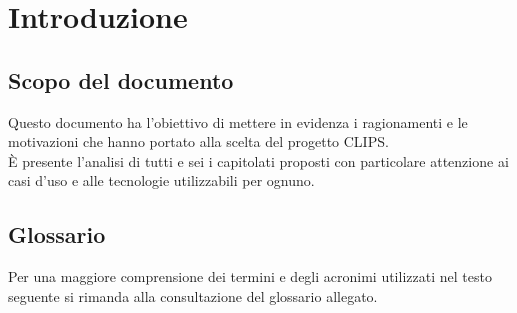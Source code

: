 \section{Introduzione}
\subsection{Scopo del documento}

Questo documento ha l'obiettivo di mettere in evidenza i ragionamenti e le motivazioni che hanno portato alla scelta del progetto CLIPS.\\
È presente l'analisi di tutti e sei i capitolati proposti con particolare attenzione ai casi d'uso e alle tecnologie utilizzabili per ognuno.

\subsection{Glossario}

Per una maggiore comprensione dei termini e degli acronimi utilizzati nel testo seguente si rimanda alla consultazione del glossario allegato.